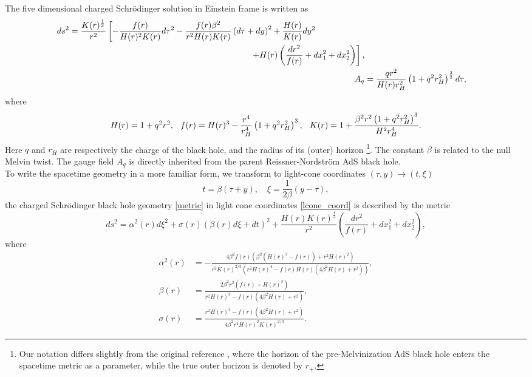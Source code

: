 \documentclass[12pt,a4paper]{article}
\numberwithin{equation}{section}
\begin{document}
The five dimensional charged Schr\"{o}dinger solution in Einstein frame is written as
%
\begin{align} \label{metric}
	\begin{split}
	ds^2 &= \frac{K(r)^{\frac{1}{3}}}{r^2}\left[-\frac{f(r)}{H(r)^2 K(r)}d\tau^2 - \frac{f(r)\beta^2}{r^2 H(r) K(r)}\left(d\tau+dy\right)^2 + \frac{H(r)}{K(r)}dy^2 \right.\\ & \hspace{7.5 cm} \left. + H(r)\left(\frac{dr^2}{f(r)}+dx_1^2+dx_2^2 \right) \right],
	\end{split}\\
    A_q &= \frac{q r^2}{H(r) r_H^2}\left(1 + q^2 r_H^2\right)^{\frac{3}{2}} d\tau,
\end{align}
%
where
%
\begin{equation}
	H(r) = 1+q^2r^2, \hspace{2.5 mm} f(r) = H(r)^3 - \frac{r^4}{r_H^4}\left(1 + q^2r_H^2\right)^3, \hspace{2.5 mm} K(r) = 1 + \frac{\beta^2r^2\left(1 + q^2r_H^2\right)^3}{H^2r_H^4}.
\end{equation}
%
Here $q$ and $r_H$ are respectively the charge of the black hole, and the radius of its (outer) horizon \footnote{Our notation differs slightly from the original reference \cite{Adams:2009dm}, where the horizon of the pre-Melvinization AdS black hole enters the spacetime metric as a parameter, while the true outer horizon is denoted by $r_{+}$.}. The constant $\beta$ is related to the null Melvin twist. The gauge field $A_q$ is directly inherited from the parent Reissner-Nordstr\"{o}m AdS black hole.\\

To write the spacetime geometry in a more familiar form, we transform to light-cone coordinates $\left(\tau, y\right) \rightarrow \left(t, \xi\right)$
%
\begin{equation} \label{lcone_coord}
	t = \beta\left(\tau + y\right), \quad \xi = \frac{1}{2 \beta}\left(y- \tau\right),
\end{equation}
%
the charged Schr\"{o}dinger black hole geometry \eqref{metric} in light cone coordinates \eqref{lcone_coord} is described by the metric
%
\begin{equation} \label{metric_ADM}
		ds^2 = \alpha^2(r) d\xi^2 + \sigma(r)\left(\beta(r)d\xi + dt\right)^2 + \frac{H(r) K(r)^{\frac{1}{3}}}{r^2}\left(\frac{dr^2}{f(r)} + dx_1^2 + dx_2^2\right),
\end{equation}
%
where
%
\begin{align}
	\alpha^2(r) &= -\frac{4 \beta ^2 f(r) \left(\beta ^2 \left(H(r)^3-f(r)\right)+r^2 H(r)^2\right)}{r^2 K(r)^{2/3} \left(r^2 H(r)^4-f(r) H(r) \left(4 \beta ^2 H(r)+r^2\right)\right)},\\
	\beta(r) &= \frac{2 \beta ^2 r^2 \left(f(r)+H(r)^3\right)}{r^2 H(r)^3-f(r) \left(4 \beta ^2 H(r)+r^2\right)},\\
	\sigma(r) &= \frac{r^2 H(r)^3-f(r) \left(4 \beta ^2 H(r)+r^2\right)}{4 \beta ^2 r^4 H(r)^2 K(r)^{2/3}}.
\end{align}
%
\end{document}

